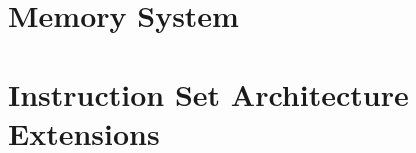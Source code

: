 \section{Memory System}
\label{section:memory_system}


\section{Instruction Set Architecture Extensions}
\label{sec:programming_models}

